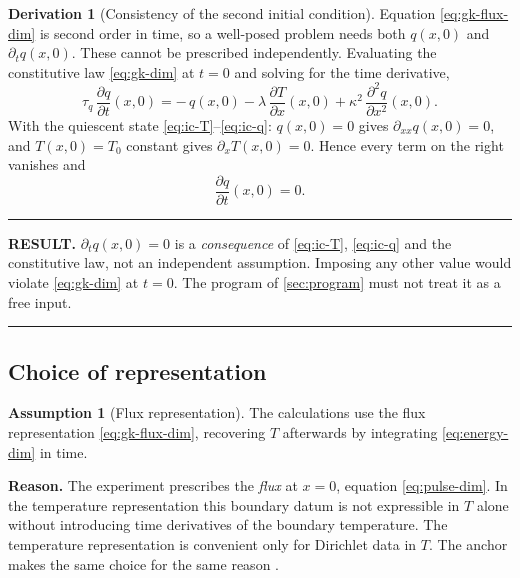 \documentclass[11pt,a4paper]{article}
\theoremstyle{definition}
\newtheorem{assumptionx}{Assumption}[section]
\newtheorem{derivationx}{Derivation}[section]
\newenvironment{resultbox}%
  {\par\medskip\noindent\begin{minipage}{\linewidth}%
   \rule{\linewidth}{1.0pt}\par\noindent\textbf{RESULT.}\enspace}%
  {\par\rule{\linewidth}{1.0pt}\end{minipage}\par\medskip}
\newcommand{\tq}{\tau_{q}}
\newcommand{\kk}{\kappa^{2}}
\begin{document}
\begin{derivationx}[Consistency of the second initial condition]
\label{der:ic}
Equation \eqref{eq:gk-flux-dim} is second order in time, so a well-posed
problem needs both $q(x,0)$ and $\partial_{t}q(x,0)$. These cannot be
prescribed independently. Evaluating the constitutive law \eqref{eq:gk-dim} at
$t=0$ and solving for the time derivative,
\begin{equation}
  \tq\,\frac{\partial q}{\partial t}(x,0)
  = -\,q(x,0)
    - \lambda\,\frac{\partial T}{\partial x}(x,0)
    + \kk\,\frac{\partial^{2} q}{\partial x^{2}}(x,0) .
  \label{eq:ic-derived-eq}
\end{equation}
With the quiescent state \eqref{eq:ic-T}--\eqref{eq:ic-q}: $q(x,0)=0$ gives
$\partial_{xx}q(x,0)=0$, and $T(x,0)=T_{0}$ constant gives
$\partial_{x}T(x,0)=0$. Hence every term on the right vanishes and
\begin{equation}
  \frac{\partial q}{\partial t}(x,0) = 0 .
  \label{eq:ic-qdot}
\end{equation}
\end{derivationx}

\begin{resultbox}
$\partial_{t}q(x,0)=0$ is a \emph{consequence} of \eqref{eq:ic-T},
\eqref{eq:ic-q} and the constitutive law, not an independent assumption.
Imposing any other value would violate \eqref{eq:gk-dim} at $t=0$. The program
of \cref{sec:program} must not treat it as a free input.
\end{resultbox}

\subsection{Choice of representation}
\label{sec:representation}

\begin{assumptionx}[Flux representation]
\label{ass:qrep}
The calculations use the flux representation \eqref{eq:gk-flux-dim}, recovering
$T$ afterwards by integrating \eqref{eq:energy-dim} in time.
\end{assumptionx}

\textbf{Reason.} The experiment prescribes the \emph{flux} at $x=0$, equation
\eqref{eq:pulse-dim}. In the temperature representation this boundary datum is
not expressible in $T$ alone without introducing time derivatives of the
boundary temperature. The temperature representation is convenient only for
Dirichlet data in $T$. The anchor makes the same choice for the same reason
\cite{Kovacs2018,KovacsVan2015}.
\end{document}
